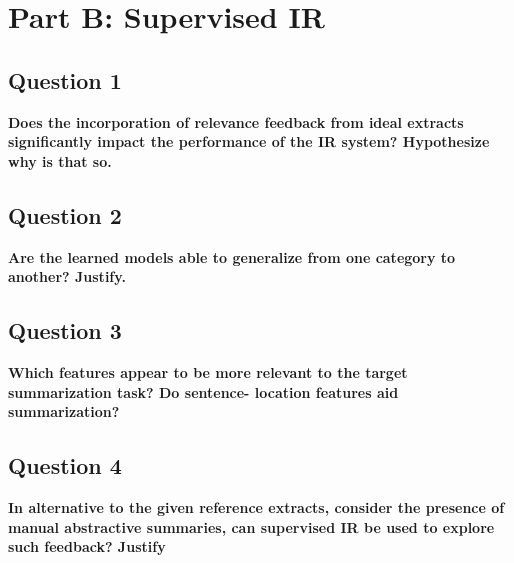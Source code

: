 \section*{Part B: Supervised IR}
\subsection{Question 1}
\textbf{ Does the incorporation of relevance feedback from ideal extracts significantly impact the performance of the IR system? Hypothesize why is that so.}

\subsection{Question 2}
\textbf{ Are the learned models able to generalize from one category to another? Justify.}
\subsection{Question 3}

\textbf{Which features appear to be more relevant to the target summarization task? Do sentence- location features aid summarization?}

\subsection{Question 4}
\textbf{In alternative to the given reference extracts, consider the presence of manual abstractive summaries, can supervised IR be used to explore such feedback? Justify}

